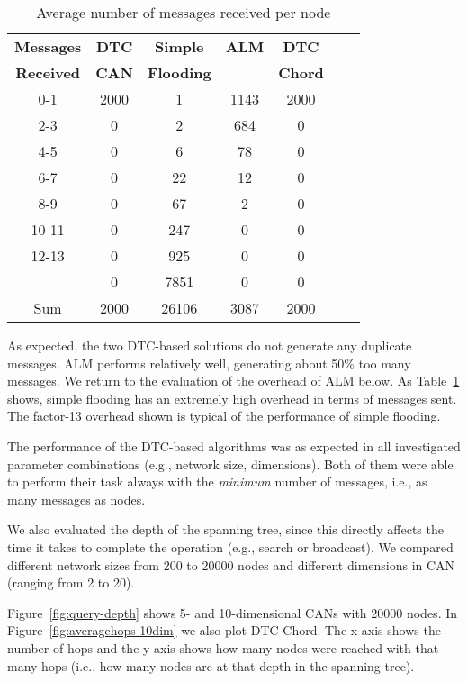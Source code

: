 \documentclass[fleqn,12pt,twoside]{article}
\begin{document}
\begin{table}[!tb]
  \centering
  \begin{tabular}{|c|c|c|c|c|c|c|}
    \hline
    \textbf{Messages} & \textbf{DTC} & \textbf{Simple}   & \textbf{ALM}
    & \textbf{DTC}\\ 
    \textbf{Received} &	\textbf{CAN} & \textbf{Flooding} & &
    \textbf{Chord} \\ 
    \hline			
    0-1 &    2000 & 1 &    1143 &    2000 \\
    2-3 &   					0		&					2				&	684		&0\\
    4-5	&							0		&					6	  		&	78		&0 \\ 
    6-7	&							0		&					22				&	12		&0\\ 
    8-9	&							0		&					67			&	2			&0\\
    10-11&							0		&					247			&	0			&0\\
    12-13&							0		&					925			&	0			&0\\
    &						0		&					7851		&	0			&0\\
    \hline
    Sum& 2000 &	26106 & 3087 & 2000 \\
    \hline						
  \end{tabular}
  \caption{Average number of messages received per node}
  \label{tab:HopCountsForMulticastInCAN}
  \vskip -5mm
\end{table}


As expected, the two DTC-based solutions do not generate any duplicate
messages. ALM performs relatively well, generating about 50\% too many
messages.  We return to the evaluation of the overhead of ALM below.
As Table~\ref{tab:HopCountsForMulticastInCAN} shows, simple flooding
has an extremely high overhead in terms of messages sent. The
factor-13 overhead shown is typical of the performance of simple
flooding.

The performance of the DTC-based algorithms was as expected in all
investigated parameter combinations (e.g., network size, dimensions).
Both of them were able to perform their task always with the
\emph{minimum} number of messages, i.e., as many messages as nodes.

We also evaluated the depth of the spanning tree, since this directly
affects the time it takes to complete the operation (e.g., search or
broadcast). We compared different network sizes from 200 to 20000
nodes and different dimensions in CAN (ranging from 2 to 20).

Figure~\ref{fig:query-depth} shows 5- and 10-dimensional CANs with
20000 nodes. In Figure~\ref{fig:averagehops-10dim} we also plot
DTC-Chord. The x-axis shows the number of hops and the y-axis shows
how many nodes were reached with that many hops (i.e., how many nodes
are at that depth in the spanning tree).
\end{document}
